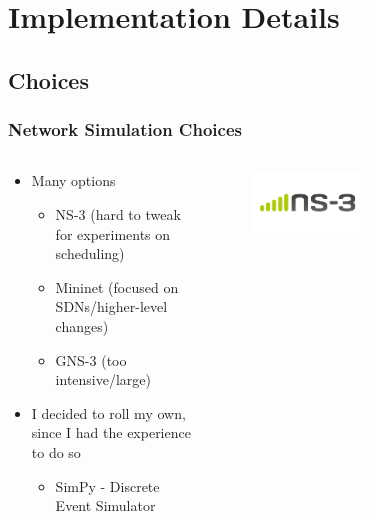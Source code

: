 \documentclass[compress]{beamer}
\begin{document}
    \section{Implementation Details}

    \subsection{Choices}
    \begin{frame}
        \frametitle{Network Simulation Choices}
        \begin{columns}
            \begin{column}{0.5\textwidth}
                \begin{itemize}
                    \item Many options
                    \begin{itemize}
                        \item NS-3 \alert{(hard to tweak for experiments on scheduling)}
                        \item Mininet \alert{(focused on SDNs/higher-level changes)}
                        \item GNS-3 \alert{(too intensive/large)}
                    \end{itemize}
                    \item I decided to roll my own, since I had the experience to do so
                    \begin{itemize}
                        \item SimPy - Discrete Event Simulator
                    \end{itemize}
                \end{itemize}
            \end{column}
            \begin{column}{0.5\textwidth}
                \begin{figure}
                    \centering
                    \includegraphics[width=0.5\textwidth]{img/ns-3.png}
                \end{figure}
                \begin{figure}

\end{figure}
\end{column}
\end{columns}
\end{frame}
\end{document}
